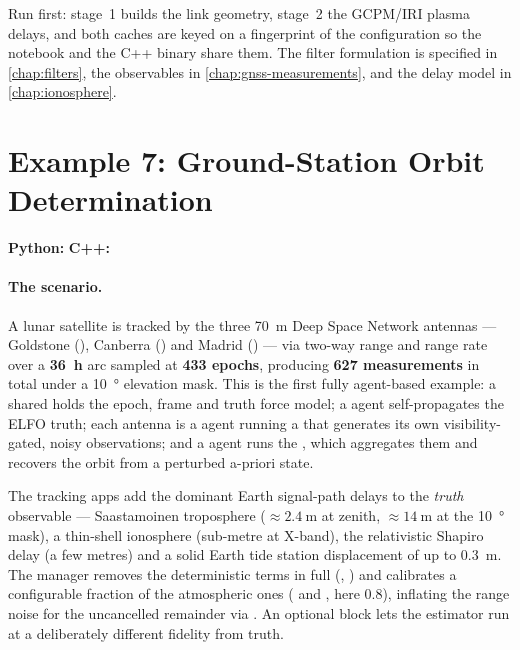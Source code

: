 Run  first: stage~1 builds the link
geometry, stage~2 the GCPM/IRI plasma delays, and both caches are keyed on a
fingerprint of the configuration so the notebook and the C++ binary share them.
The filter formulation is specified in \cref{chap:filters}, the observables in
\cref{chap:gnss-measurements}, and the delay model in \cref{chap:ionosphere}.

\section{Example 7: Ground-Station Orbit Determination}
\label{sec:tut-ex7}

\textbf{Python:}  \quad
\textbf{C++:} 

\paragraph{The scenario.}
A lunar satellite is tracked by the three \SI{70}{\meter} Deep Space Network
antennas --- Goldstone (), Canberra () and Madrid
() --- via two-way range and range rate over a
\textbf{\SI{36}{\hour}} arc sampled at \textbf{433 epochs}, producing
\textbf{627 measurements} in total under a \SI{10}{\degree} elevation mask.
This is the first fully agent-based example: a shared  holds the
epoch, frame and truth force model; a  agent self-propagates the
ELFO truth; each antenna is a  agent running a
 that generates its own visibility-gated, noisy
observations; and a  agent runs the
, which aggregates them and recovers the orbit from
a perturbed a-priori state.

The tracking apps add the dominant Earth signal-path delays to the \emph{truth}
observable --- Saastamoinen troposphere ($\approx\SI{2.4}{\meter}$ at zenith,
$\approx\SI{14}{\meter}$ at the \SI{10}{\degree} mask), a thin-shell ionosphere
(sub-metre at X-band), the relativistic Shapiro delay (a few metres) and a solid
Earth tide station displacement of up to \SI{0.3}{\meter}. The manager removes
the deterministic terms in full (,
) and calibrates a configurable fraction of the
atmospheric ones ( and
, here 0.8), inflating the range noise for
the uncancelled remainder via . An optional
 block lets the estimator run at a deliberately
different fidelity from truth.

